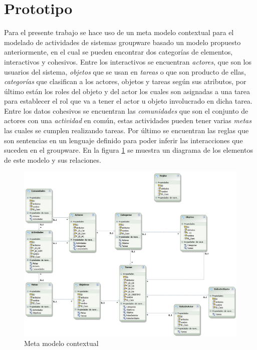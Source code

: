 \section{Prototipo}
Para el presente trabajo se hace uso de un meta modelo contextual para el modelado de actividades de sistemas groupware basado un modelo propuesto anteriormente\cite{montane2013context}, en el cual se pueden encontrar dos categor\'ias de elementos, interactivos y cohesivos.  Entre los interactivos se encuentran \textit{actores}, que son los usuarios del sistema, \textit{objetos} que se usan en \textit{tareas} o que son producto de ellas, \textit{categor\'ias} que clasifican a los actores, objetos y tareas seg\'un sus atributos, por \'ultimo est\'an los roles del objeto y del actor los cuales son asignadas a una tarea para establecer el rol que va a tener el actor u objeto involucrado en dicha tarea. Entre los datos cohesivos se encuentran las \textit{comunidades} que son el conjunto de actores con una \textit{actividad} en com\'un, estas actividades pueden tener varias \textit{metas} las cuales se cumplen realizando tareas. Por \'ultimo se encuentran las reglas que son sentencias en un lenguaje definido para poder inferir las interacciones que suceden en el groupware. En la figura \ref{cmp:mmc} se muestra un diagrama de los elementos de este modelo y sus relaciones.

\begin{figure}[h!]
  \centering
    \includegraphics[scale=0.35]{images/modelo}
  \caption{Meta modelo contextual}
  \label{cmp:mmc}
\end{figure}


